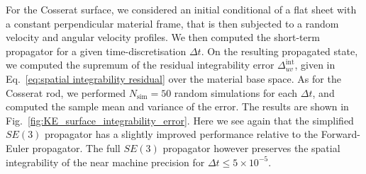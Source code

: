 For the Cosserat surface, we considered an initial conditional of a flat sheet with a constant perpendicular material frame, that is then subjected to a random velocity and angular velocity profiles. We then computed the short-term propagator for a given time-discretisation $\Delta t$. On the resulting propagated state, we computed the supremum of the residual integrability error $\Delta^\text{int}_{u v}$, given in Eq.~\ref{eq:spatial integrability residual} over the material base space. As for the Cosserat rod, we performed $N_\text{sim} = 50$ random simulations for each $\Delta t$, and computed the sample mean and variance of the error. The results are shown in Fig.~\ref{fig:KE_surface_integrability_error}. Here we see again that the simplified $SE(3)$ propagator has a slightly improved performance relative to the Forward-Euler propagator. The full $SE(3)$ propagator however preserves the spatial integrability of the near machine precision for $\Delta t \leq 5 \times 10^{-5}$.

